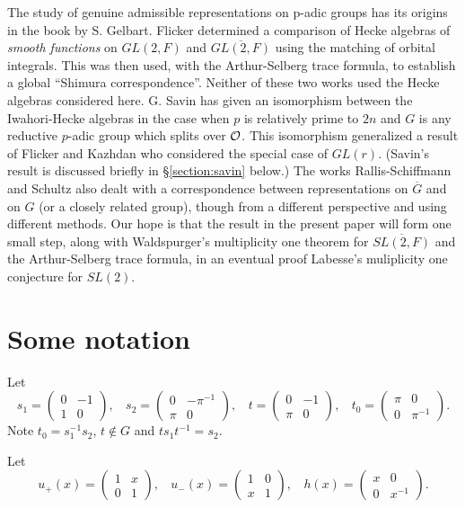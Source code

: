 The study of genuine admissible representations
on p-adic groups has its origins in the
book \cite{G} by S. Gelbart. Flicker \cite{F}
determined a comparison of Hecke algebras of
{\it smooth functions} on $GL(2,F)$ and 
$\overline{GL(2,F)}$ using the matching of orbital integrals.
This was then used, with the Arthur-Selberg trace formula, to 
establish a global ``Shimura correspondence''.
Neither of these two works used the Hecke algebras considered here.
G. Savin \cite{S} has given an isomorphism between
the Iwahori-Hecke algebras in the case when $p$ is
relatively prime to $2n$ and $G$ is any reductive
$p$-adic group which splits over ${\cal O}$. This isomorphism 
generalized a result of Flicker and Kazhdan \cite{FK} who
considered the special case of $GL(r)$. 
(Savin's result is discussed briefly
in \S \ref{section:savin} below.)
The works Rallis-Schiffmann \cite{RS} and Schultz
\cite{Sch} also dealt with a correspondence between
representations on $\overline{G}$ and on $G$ (or a closely related 
group),
though from a different perspective and using different methods.
Our hope is that the result in the present paper will form
one small step, along with Waldspurger's
multiplicity one theorem for $\overline{SL(2,F)}$ 
\cite{W} and the Arthur-Selberg trace formula, in an eventual proof 
Labesse's muliplicity one conjecture for $SL(2)$. 

\section{Some notation}

Let
\[
s_1=
\left(
\begin{array}{cc}
0 & -1\\
1 & 0
\end{array}
\right),\ \ \ \ 
s_2=
\left(
\begin{array}{cc}
0 & -\pi^{-1}\\
\pi & 0
\end{array}
\right),\ \ \ \ 
t=
\left(
\begin{array}{cc}
0 & -1\\
\pi & 0
\end{array}
\right),\ \ \ \ 
t_0=
\left(
\begin{array}{cc}
\pi & 0 \\
0 & \pi^{-1}
\end{array}
\right).
\]
Note $t_0=s_1^{-1}s_2$, $t\notin G$ and $ts_1t^{-1}=s_2$. 

Let
\[
u_+(x)=\left(
\begin{array}{cc}
1 & x\\
0 & 1
\end{array}
\right),\ \ \ \ 
u_-(x)=\left(
\begin{array}{cc}
1 & 0\\
x & 1
\end{array}
\right),\ \ \ \ 
h(x)=\left(
\begin{array}{cc}
x & 0\\
0 & x^{-1}
\end{array}
\right).
\]

